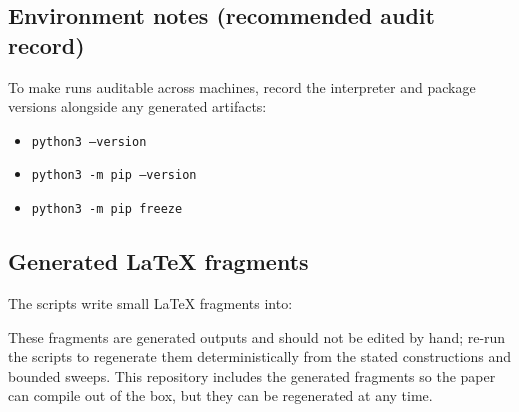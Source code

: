 \subsection{Environment notes (recommended audit record)}
To make runs auditable across machines, record the interpreter and package versions alongside any generated artifacts:
\begin{itemize}
\item \texttt{python3 --version}
\item \texttt{python3 -m pip --version}
\item \texttt{python3 -m pip freeze}
\end{itemize}

\subsection{Generated LaTeX fragments}
The scripts write small LaTeX fragments into:
\begin{center}
\end{center}
These fragments are generated outputs and should not be edited by hand; re-run the scripts to regenerate them deterministically from the stated constructions and bounded sweeps.
This repository includes the generated fragments so the paper can compile out of the box, but they can be regenerated at any time.


